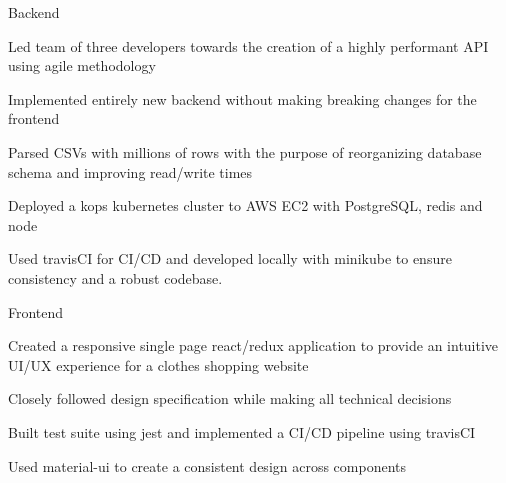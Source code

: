 
\begin{cventries}
  \cventry
    {} %
    {Backend} %
    {} %
    {} %
    {
      \begin{cvitems} %
        \item {Led team of three developers towards the creation of a highly performant API using agile methodology}
        \item {Implemented entirely new backend without making breaking changes for the frontend}
		\item {Parsed CSVs with millions of rows with the purpose of reorganizing database schema and improving read/write times}
		\item {Deployed a kops kubernetes cluster to AWS EC2 with PostgreSQL, redis and node}
		\item {Used travisCI for CI/CD and developed locally with minikube to ensure consistency and a robust codebase.}
      \end{cvitems}
    }
  
  \cventry
    {} %
    {Frontend} %
    {} %
    {} %
    {
      \begin{cvitems} %
		\item {Created a responsive single page react/redux application to provide an intuitive UI/UX experience for a clothes shopping website}
		\item {Closely followed design specification while making all technical decisions}
		\item {Built test suite using jest and implemented a CI/CD pipeline using travisCI}
		\item {Used material-ui to create a consistent design across components}
      \end{cvitems}
    }

    

\end{cventries}
